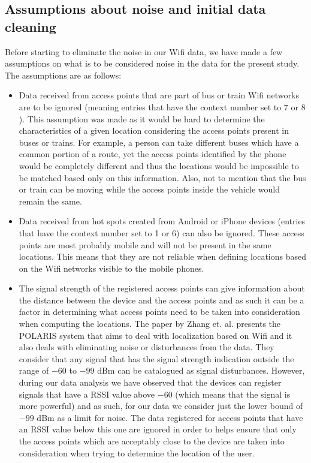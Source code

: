\subsection{Assumptions about noise and initial data cleaning}
\label{noise_assumptions}
Before starting to eliminate the noise in our Wifi data, we have made a
few assumptions on what is to be considered noise in the data for the present
study. The assumptions are as follows:
\begin{itemize}
  \item Data received from access points that are part of bus or train Wifi
  networks are to be ignored (meaning entries that have the context number set
  to $7$ or $8$). This assumption was made as it would be hard to determine the
  characteristics of a given location considering the access points present in
  buses or trains. For example, a person can take different buses which have a
  common portion of a route, yet the access points identified by the phone would
  be completely different and thus the locations would be impossible to be
  matched based only on this information. Also, not to mention that the bus or
  train can be moving while the access points inside the vehicle would remain
  the same.
  \item Data received from hot spots created from Android or iPhone devices
  (entries that have the context number set to 1 or 6) can also be ignored.
  These access points are most probably mobile and will not be present in the
  same locations. This means that they are not reliable when defining locations
  based on the Wifi networks visible to the mobile phones.
  \item The signal strength of the registered access points can give
  information about the distance between the device and the access points and
  as such it can be a factor in determining what access points need to be
  taken into consideration when computing the locations. The paper by Zhang
  et. al. \cite{zhang2012polaris} presents the POLARIS system that aims to deal
  with localization based on Wifi and it also deals with eliminating noise or
  disturbances from the data. They consider that any signal that has the signal
  strength indication outside the range of $-60$ to $-99$ dBm can be catalogued
  as signal disturbances. However, during our data analysis we have observed that
  the devices can register signals that have a RSSI value above $-60$ (which
  means that the signal is more powerful) and as such, for our data we
  consider just the lower bound of $-99$ dBm as a limit for noise. The data
  registered for access points that have an RSSI value below this one are
  ignored in order to helps ensure that only the access points which are
  acceptably close to the device are taken into consideration when trying to
  determine the location of the user.
\end{itemize}

